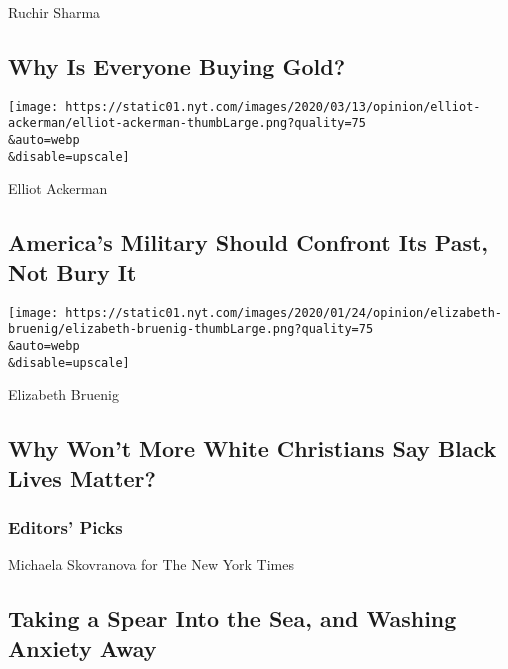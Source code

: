 Ruchir Sharma

\hypertarget{why-is-everyone-buying-gold}{%
\subsection{Why Is Everyone Buying
Gold?}\label{why-is-everyone-buying-gold}}

\href{/2020/08/08/opinion/nazi-confederate-military-history-ksk.html}{}

\texttt{[image: https://static01.nyt.com/images/2020/03/13/opinion/elliot-ackerman/elliot-ackerman-thumbLarge.png?quality=75\\\&auto=webp\\\&disable=upscale]}

Elliot Ackerman

\hypertarget{americas-military-should-confront-its-past-not-bury-it}{%
\subsection{America's Military Should Confront Its Past, Not Bury
It}\label{americas-military-should-confront-its-past-not-bury-it}}

\href{/2020/08/06/opinion/sunday/gloria-purvis-george-floyd-blm.html}{}

\texttt{[image: https://static01.nyt.com/images/2020/01/24/opinion/elizabeth-bruenig/elizabeth-bruenig-thumbLarge.png?quality=75\\\&auto=webp\\\&disable=upscale]}

Elizabeth Bruenig

\hypertarget{why-wont-more-white-christians-say-black-lives-matter}{%
\subsection{Why Won't More White Christians Say Black Lives
Matter?}\label{why-wont-more-white-christians-say-black-lives-matter}}

\hypertarget{editors-picks}{%
\subsubsection{Editors' Picks}\label{editors-picks}}

\href{/2020/08/03/world/australia/spearfishing-sydney-coronavirus.html}{}

Michaela Skovranova for The New York Times

\href{/2020/08/03/world/australia/spearfishing-sydney-coronavirus.html}{}

\hypertarget{taking-a-spear-into-the-sea-and-washing-anxiety-away}{%
\subsection{Taking a Spear Into the Sea, and Washing Anxiety
Away}\label{taking-a-spear-into-the-sea-and-washing-anxiety-away}}

